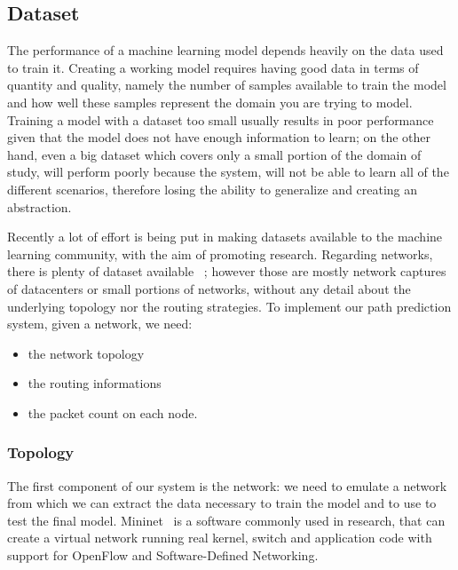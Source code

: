 \subsection{Dataset}
The performance of a machine learning model depends heavily on the data used to train it. Creating a working model requires having good data in terms of quantity and quality, namely the number of samples available to train the model and how well these samples represent the domain you are trying to model. Training a model with a dataset too small usually results in poor performance given that  the model does not have enough information to learn; on the other hand, even a big dataset which covers only a small portion of the domain of study, will perform poorly because the system, will not be able to learn all of the different scenarios, therefore losing the ability to generalize and creating an abstraction.

Recently a lot of effort is being put in making datasets available to the machine learning community, with the aim of promoting research. Regarding networks, there is plenty of dataset available ~\cite{caida}\cite{fb_dataset}\cite{topo_zoo}; however those are mostly network captures of datacenters or small portions of networks, without any detail about the underlying topology nor the routing strategies. To implement our path prediction system, given a network, we need:
\begin{itemize}
\item the network topology
\item the routing informations
\item the packet count on each node.	
\end{itemize}

\subsubsection{Topology}
\label{sec:net_topology}
The first component of our system is the network: we need to emulate a network from which we can extract the data necessary to train the model and to use to test the final model. Mininet~\cite{mininet} is a software commonly used in research, that can create a virtual network running real kernel, switch and application code with support for OpenFlow and Software-Defined Networking\cite{openflow}.

